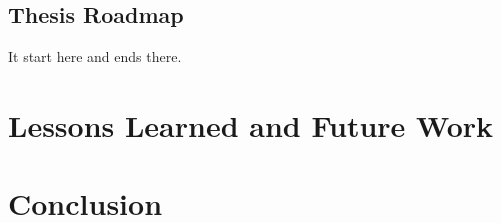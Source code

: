 \documentclass{ucbthesis}
\begin{document}
\section{Thesis Roadmap}
It start here and ends there.






% 

\chapter{Lessons Learned and Future Work}
\chapter{Conclusion}


\printbibliography
\end{document}
